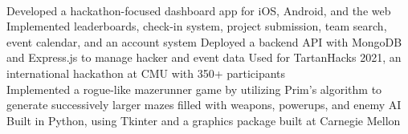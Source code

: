 \documentclass[]{paws}
\begin{document}
{    \, \\
    {Developed a hackathon-focused dashboard app for iOS, Android, and the web}
    {Implemented leaderboards, check-in system, project submission, team search, event calendar, and an account system}
    {Deployed a backend API with MongoDB and Express.js to manage hacker and event data}
    {Used for TartanHacks 2021, an international hackathon at CMU with 350+ participants}
    \, \\
    {Implemented a rogue-like mazerunner game by utilizing Prim's algorithm to generate successively larger mazes filled with weapons, powerups, and enemy AI}
    {Built in Python, using Tkinter and a graphics package built at Carnegie Mellon}

    \, \\ \\ \\

}
\end{document}
